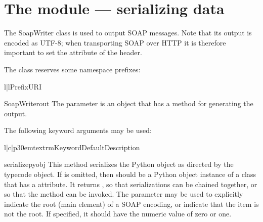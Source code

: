 \chapter{The  module --- serializing data}

The SoapWriter class is used to output SOAP messages.
Note that its output is encoded as UTF-8; when transporting SOAP over
HTTP it is therefore important to set the  attribute
of the  header.

The  class reserves some namespace prefixes:
\begin{tableii}{l|l}{}{Prefix}{URI}
\end{tableii}

\begin{classdesc}{SoapWriter}{out}
The  parameter is an object that has a 
method for generating the output.

The following keyword arguments may be used:

\begin{tableiii}{l|c|p{30em}}{textrm}{Keyword}{Default}{Description}
\end{tableiii}
\end{classdesc}

\begin{methoddesc}{serialize}{pyobj}
This method serializes the  Python object as directed
by the  typecode object.
If  is omitted, then  should be a Python
object instance of a class that has a  attribute.
It returns , so that serializations can be chained together, or
so that the  method can be invoked.
The  parameter may be used to explicitly indicate the root
(main element) of a SOAP encoding, or indicate that the item is not the
root.
If specified, it should have the numeric value of zero or one.
\end{methoddesc}

